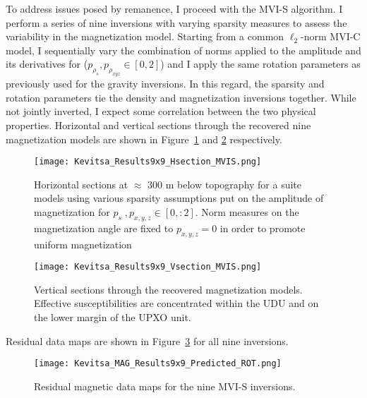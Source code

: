 To address issues posed by remanence, I proceed with the MVI-S algorithm.
I perform a series of nine inversions with varying sparsity measures to assess the variability in the magnetization model. Starting from a common $\ell_2$-norm MVI-C model, I sequentially vary the combination of norms applied to the amplitude and its derivatives for ($p_{\rho_s}, p_{\rho_{xyz}} \in [0, 2]$) and I apply the same rotation parameters as previously used for the gravity inversions. In this regard, the sparsity and rotation parameters tie the density and magnetization inversions together. While not jointly inverted, I expect some correlation between the two physical properties.
Horizontal and vertical sections through the recovered nine magnetization models are shown in Figure~\ref{MVIS_Hsections} and \ref{MVIS_Vsections} respectively.
\begin{figure}[h!]
\texttt{[image: Kevitsa\_Results9x9\_Hsection\_MVIS.png]}
\caption{Horizontal sections at $\approx$ 300 m below topography for a suite models using various sparsity assumptions put on the amplitude of magnetization for $p_s\;, p_{x,y,z} \in [0,:2]$. Norm measures on the magnetization angle are fixed to $p_{x,y,z}=0$ in order to promote uniform magnetization}
\label{MVIS_Hsections}
\end{figure}
\begin{figure}[h!]
\texttt{[image: Kevitsa\_Results9x9\_Vsection\_MVIS.png]}
\caption{Vertical sections through the recovered magnetization models. Effective susceptibilities are concentrated within the UDU and on the lower margin of the UPXO unit.}
\label{MVIS_Vsections}
\end{figure}
Residual data maps are shown in Figure~\ref{Kevitsa_MAG_Results9x9_Predicted} for all nine inversions.
\begin{figure}
\texttt{[image: Kevitsa\_MAG\_Results9x9\_Predicted\_ROT.png]}
\caption{Residual magnetic data maps for the nine MVI-S inversions.}
\label{Kevitsa_MAG_Results9x9_Predicted}
\end{figure}


